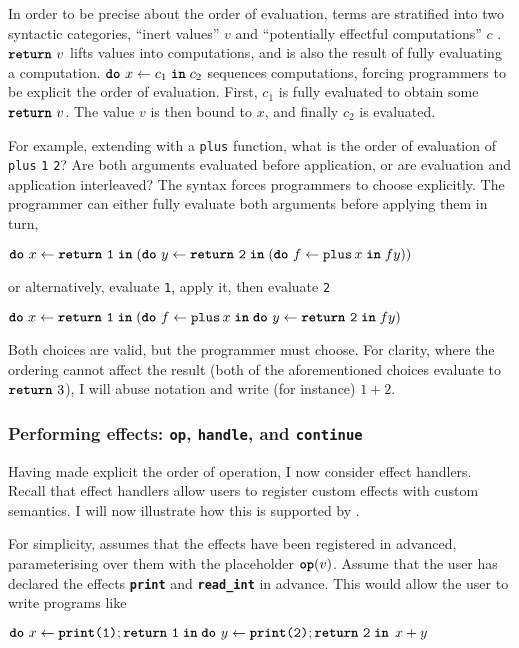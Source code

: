 In order to be precise about the order of evaluation, \efflang{} terms are stratified into two syntactic categories, ``inert values'' $v$ and ``potentially effectful computations'' $c$ \citep{pretnar-15}. $\texttt{\textbf{return}} \,\, {v}$ lifts values into computations, and is also the result of fully evaluating a computation. $\texttt{\textbf{do}} \,\, {x} \leftarrow {c_1} \; \textbf{\texttt{in}} \; {c_2}$ sequences computations, forcing programmers to be explicit the order of evaluation.  First, $c_1$ is fully evaluated to obtain some $\texttt{\textbf{return}} \,\, {v}$. The value $v$ is then bound to $x$, and finally $c_2$ is evaluated. 

For example, extending \efflang{} with a \texttt{plus} function, what is the order of evaluation of \texttt{plus} \texttt{1} \texttt{2}? Are both arguments evaluated before application, or are evaluation and application interleaved? The syntax forces programmers to choose explicitly. The programmer can either fully evaluate both arguments before applying them in turn, 
\begin{eff}
$\texttt{\textbf{do}} \,\, {x} \leftarrow {\texttt{\textbf{return}} \,\, {\texttt{1}}} \; \textbf{\texttt{in}} \; {(\texttt{\textbf{do}} \,\, {y} \leftarrow {\texttt{\textbf{return}} \,\, {\texttt{2}}} \; \textbf{\texttt{in}} \; {(\texttt{\textbf{do}} \,\, {f} \leftarrow {\texttt{plus} \, x} \; \textbf{\texttt{in}} \; {f y})})}$
\end{eff}
or alternatively, evaluate \texttt{1}, apply it, then evaluate \texttt{2}
\begin{eff}
$\texttt{\textbf{do}} \,\, {x} \leftarrow {\texttt{\textbf{return}} \,\, {\texttt{1}}} \; \textbf{\texttt{in}} \; {(\texttt{\textbf{do}} \,\, {f} \leftarrow {\texttt{plus} \, x} \; \textbf{\texttt{in}} \; {\texttt{\textbf{do}} \,\, {y} \leftarrow {\texttt{\textbf{return}} \,\, {\texttt{2}}} \; \textbf{\texttt{in}} \; {f y}})}$
\end{eff}

Both choices are valid, but the programmer must choose. For clarity, where the ordering cannot affect the result (both of the aforementioned choices evaluate to $\texttt{\textbf{return}} \,\, {3}$), I will abuse notation and write (for instance) $1+2$. 

\subsubsection{Performing effects: \texttt{op}, \texttt{handle}, and \texttt{continue}}
Having made explicit the order of operation, I now consider effect handlers. Recall that effect handlers allow users to register custom effects with custom semantics. I will now illustrate how this is supported by \efflang{}.

For simplicity, \efflang{} assumes that the effects have been registered in advanced, parameterising over them with the placeholder $\textbf{\texttt{op}}({v})$. Assume that the user has declared the effects \texttt{\textbf{print}} and \texttt{\textbf{read\_int}} in advance. This would allow the user to write programs like 
\begin{eff}
$\texttt{\textbf{do}} \,\, {x} \leftarrow {\texttt{\textbf{print}(1)};\texttt{\textbf{return}} \,\, {\texttt{1}}} \; \textbf{\texttt{in}} \; {{\texttt{\textbf{do}} \,\, {y} \leftarrow {\texttt{\textbf{print}(2)};\texttt{\textbf{return}} \,\, {\texttt{2}}} \; \textbf{\texttt{in}} \; {\, x + y}}}$
\end{eff}

